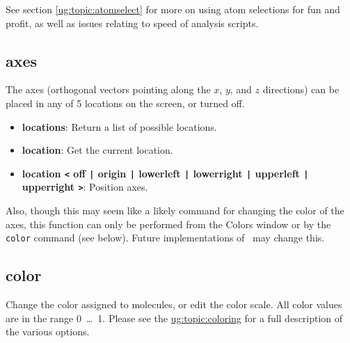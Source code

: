 \begin{itemize}
\begin{itemize}
\end{itemize}

See section \ref{ug:topic:atomselect} for more on 
using atom selections for fun and profit, as well as issues relating to
speed of analysis scripts.

\end{itemize}


  \subsection{axes}
The axes (orthogonal vectors pointing along the $x$, $y$, and $z$
directions) can be placed in any of 5 locations on the screen, or
turned off.  

  \begin{itemize}
    \item {\bf locations}: Return a list of possible locations.
    \item {\bf location}: Get the current location.
    \item {\bf location {\tt <}  off {\tt |} origin {\tt |} lowerleft {\tt |} lowerright {\tt |} upperleft {\tt |} upperright {\tt >}}: Position axes.
  \end{itemize}

Also, though this may seem like a likely command for changing the color of
the axes, this function can only be performed from the {\sf Colors} window or by
the {\tt color} command (see below).  Future
implementations of \VMD\ may change this.


  \subsection{color}
  \label{ug:ui:text:color}
  
Change the color assigned to molecules, or edit the color scale.  All
color values are in the range \mbox{0 \ldots\ 1}.  Please see the 
\hyperref{section on coloring}{section on coloring [\S~}{]}
{ug:topic:coloring} for a full description of the various options. 

